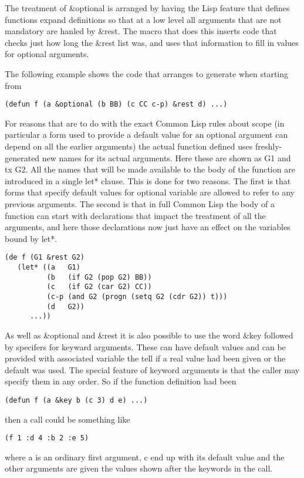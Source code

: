 The treatment of {\tx \&optional} is arranged by having the Lisp feature
that defines functions expand definitions so that at a low level all
arguments that are not mandatory are hanled by {\tx \&rest}. The
macro that does this inserts code that checks just how long the
{\tx \&rest} list was, and uses that information to fill in values for
optional arguments.

The following example shows the code that \vcl{} arranges to generate when
starting from
{\small\begin{verbatim}
(defun f (a &optional (b BB) (c CC c-p) &rest d) ...)
\end{verbatim}}

For reasons that are to do with the exact Common Lisp rules about scope
(in particular a form used to provide a default value for an optional
argument can depend on all the earlier arguments)
the actual function defined uses
freshly-generated new names for its actual arguments. Here these are shown
as {\tx G1} and {tx G2}.
All the names that will be made available to the
body of the function are introduced in a single {\tx let*} clause. This
is done for two reasons. The first is that forms that specify default
values for optional variable are allowed to refer to any previous
arguments. The second is that in full Common Lisp the body of a function
can start with declarations that impact the treatment of all the
arguments, and here those declarations now just have an effect on the
variables bound by {\tx let*}.
{\small\begin{verbatim}
(de f (G1 &rest G2)
   (let* ((a   G1)
          (b   (if G2 (pop G2) BB))
          (c   (if G2 (car G2) CC))
          (c-p (and G2 (progn (setq G2 (cdr G2)) t)))
          (d   G2))
      ...))
\end{verbatim}}

As well as {\tx \&optional} and {\tx \&rest} it is also possible to use the
word {\tx \&key} followed by specifers for keyward arguments. These can have
default values and can be provided with associated variable the tell if
a real value had been given or the default was used. The special feature of
keyword arguments is that the caller may specify them in any order. So if the
function definition had been
{\small\begin{verbatim}
(defun f (a &key b (c 3) d e) ...)
\end{verbatim}}
\noindent then a call could be something like
{\small\begin{verbatim}
(f 1 :d 4 :b 2 :e 5)
\end{verbatim}}
\noindent where {\tx a} is an ordinary first argument, {\tx c} end up with
its default value and the other arguments are given the values shown after
the keywords in the call.

